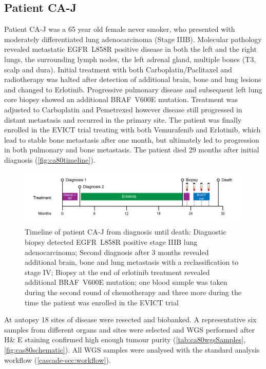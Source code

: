 \subsection{Patient CA-J}
\label{cascade-sec:CA80}

Patient CA-J was a 65 year old female never smoker, who presented with moderately differentiated lung  adenocarcinoma (Stage IIIB). Molecular pathology revealed metastatic EGFR~L858R positive disease in both the left and the right lungs, the surrounding lymph nodes, the left adrenal gland, multiple bones (T3, scalp and dura). Initial treatment with both Carboplatin/Paclitaxel and radiotherapy was halted after detection of additional brain, bone and lung lesions and changed to Erlotinib. Progressive pulmonary disease and subsequent left lung core biopsy showed an additional BRAF~V600E mutation. Treatment was adjusted to Carboplatin and Pemetrexed however disease still progressed in distant metastasis and recurred in the primary site. The patient was finally enrolled in the EVICT trial treating with both Vemurafenib and Erlotinib, which lead to stable bone metastasis after one month, but ultimately led to progression in both pulmonary and bone metastasis. The patient died 29 months after initial diagnosis (\autoref{fig:ca80timeline}).

\begin{figure}[ht]
\centering
\includegraphics[width=.99\linewidth]{Figures/CASCADE/CA80/CA-J_timeline}
\caption[Timeline of patient CA-J from diagnosis until death]{Timeline of patient CA-J from diagnosis until death: Diagnostic biopsy detected EGFR~L858R positive stage IIIB lung adenocarcinoma; Second diagnosis after 3 months revealed additional brain, bone and lung metastasis with a reclassification to stage IV; Biopsy at the end of erlotinib treatment revealed additional BRAF~V600E mutation; one blood sample was taken during the second round of chemotherapy and three more during the time the patient was enrolled in the EVICT trial} \label{fig:ca80timeline}
\end{figure}


At autopsy 18 sites of disease were resected and biobanked. A representative six samples from different organs and sites were selected and WGS performed after H\& E staining confirmed high enough tumour purity (\autoref{tab:ca80wgsSamples}, \autoref{fig:cas80schematic}). All WGS samples were analysed with the standard analysis workflow (\autoref{cascade-sec:workflow}).


